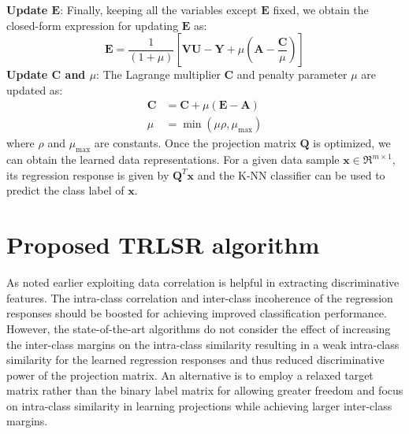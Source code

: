 \noindent\textbf{Update $\mathbf{E}$}: Finally, keeping all the variables except $\mathbf{E}$ fixed, we obtain the closed-form expression for updating $\mathbf{E}$ as:
%
\begin{equation}
    \label{eq: LRDRR_Define_E}
      \mathbf{E}  = \frac{1}{(1+\mu)}\left[\mathbf{V} \mathbf{U} - \mathbf{Y} + \mu \left(\mathbf{A} - \frac{\mathbf{C}}{\mu}\right)\right]
\end{equation}
%
\textbf{Update $\mathbf{C}$ and $\mu$}: The Lagrange multiplier $\mathbf{C}$ and penalty parameter $\mu$ are updated as:
%
\begin{equation}
    \begin{split}
        \label{eq: LRDRR_Update_Lag_penalty}
        \mathbf{C} &= \mathbf{C} + \mu (\mathbf{E} - \mathbf{A})\\
        \mu & = \min (\mu \rho, \mu_{\text{max}} ) 
    \end{split}
\end{equation}
%
where $\rho$ and $\mu_{\text{max}}$ are constants. Once the projection matrix $\mathbf{Q}$ is optimized, we can obtain the learned data representations. For a given data sample $\mathbf{x} \in \Re^{m \times 1}$, its regression response is given by $\mathbf{Q}^{T} \mathbf{x}$ and the K-NN classifier can be used to predict the class label of $\mathbf{x}$.
%
\section{Proposed TRLSR algorithm}
\label{sec: TRLSR_Method}
%
As noted earlier exploiting data correlation is helpful in extracting discriminative features. The intra-class correlation and inter-class incoherence of the regression responses should be boosted for achieving improved classification performance. However, the state-of-the-art algorithms do not consider the effect of increasing the inter-class margins on the intra-class similarity resulting in a weak intra-class similarity for the learned regression responses and thus reduced discriminative power of the projection matrix. An alternative is to employ a relaxed target matrix rather than the binary label matrix for allowing greater freedom and focus on intra-class similarity in learning projections while achieving larger inter-class margins. 

